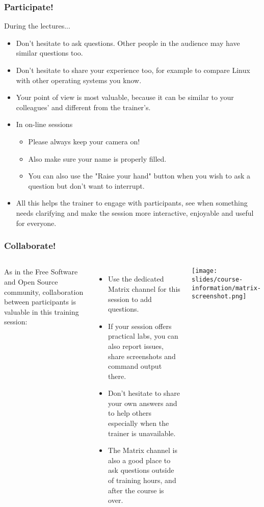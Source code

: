 \begin{frame}

\frametitle{Participate!}
During the lectures...
\begin{itemize}
\item Don't hesitate to ask questions. Other people in the audience may have
similar questions too.
\item Don't hesitate to share your experience too, for example to compare Linux
with other operating systems you know.
\item Your point of view is most valuable, because it can be similar to your
colleagues' and different from the trainer's.
\item In on-line sessions
   \begin{itemize}
   \item Please always keep your camera on!
   \item Also make sure your name is properly filled.
   \item You can also use the "Raise your hand" button when you wish to
         ask a question but don't want to interrupt.
   \end{itemize}
\item All this helps the trainer to engage with participants, see when
something needs clarifying and make the session more interactive, enjoyable
and useful for everyone.
\end{itemize}
\end{frame}

\begin{frame}
\frametitle{Collaborate!}
\begin{columns}
  As in the Free Software and Open Source community,
  collaboration between participants is valuable in this training session:
  \begin{itemize}
    \item Use the dedicated Matrix channel for this session
	  to add questions.
    \item If your session offers practical labs, you can also
          report issues, share screenshots and command output there.
    \item Don't hesitate to share your own answers and to help others
          especially when the trainer is unavailable.
    \item The Matrix channel is also a good place to ask questions
	  outside of training hours, and after the course is over.
    \end{itemize}
  \texttt{[image: slides/course-information/matrix-screenshot.png]}
\end{columns}
\end{frame}
